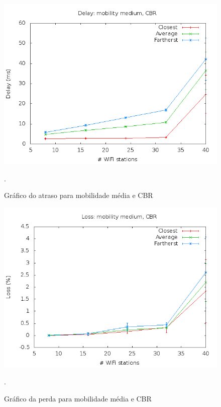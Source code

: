 \documentclass[12pt,twoside,a4paper]{article}
\begin{document}
\begin{figure}[H]
\centering
\includegraphics[scale=0.5]{mo818-delay-mob-1-traf-0}
\caption{Gráfico do atraso para mobilidade média e CBR}.
\label{fig:atraso-m1-t0}
\end{figure}

\begin{figure}[H]
\centering
\includegraphics[scale=0.5]{mo818-loss-mob-1-traf-0}
\caption{Gráfico da perda para mobilidade média e CBR}.
\label{fig:perda-m1-t0}
\end{figure}
\end{document}
